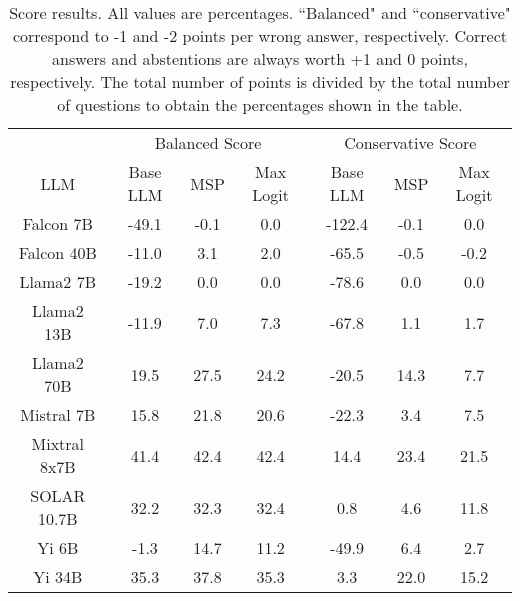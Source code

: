 \begin{table*}
\centering
\begin{tabular}{c|c|c|c|c|c|c}
& \multicolumn{3}{c|}{Balanced Score} & \multicolumn{3}{c}{Conservative Score} \\ 
LLM & Base LLM & MSP & Max Logit & Base LLM & MSP & Max Logit\\ \hline
Falcon 7B & -49.1 & -0.1 & 0.0 & -122.4 & -0.1 & 0.0\\
Falcon 40B & -11.0 & 3.1 & 2.0 & -65.5 & -0.5 & -0.2\\
Llama2 7B & -19.2 & 0.0 & 0.0 & -78.6 & 0.0 & 0.0\\
Llama2 13B & -11.9 & 7.0 & 7.3 & -67.8 & 1.1 & 1.7\\
Llama2 70B & 19.5 & 27.5 & 24.2 & -20.5 & 14.3 & 7.7\\
Mistral 7B & 15.8 & 21.8 & 20.6 & -22.3 & 3.4 & 7.5\\
Mixtral 8x7B & 41.4 & 42.4 & 42.4 & 14.4 & 23.4 & 21.5\\
SOLAR 10.7B & 32.2 & 32.3 & 32.4 & 0.8 & 4.6 & 11.8\\
Yi 6B & -1.3 & 14.7 & 11.2 & -49.9 & 6.4 & 2.7\\
Yi 34B & 35.3 & 37.8 & 35.3 & 3.3 & 22.0 & 15.2\\
\hline
\end{tabular}
\caption{Score results. All values are percentages. ``Balanced" and ``conservative" correspond to -1 and -2 points per wrong answer, respectively. Correct answers and abstentions are always worth +1 and 0 points, respectively. The total number of points is divided by the total number of questions to obtain the percentages shown in the table.}
\label{tab:score}
\end{table*}
